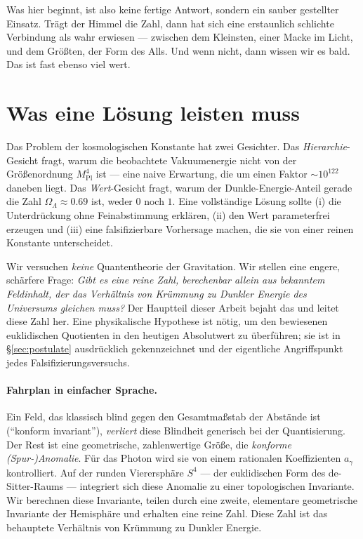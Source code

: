 \documentclass[11pt,a4paper]{article}
\theoremstyle{definition}
\theoremstyle{remark}
\newcommand{\ag}{a_\gamma}
\newcommand{\OL}{\Omega_\Lambda}
\newcommand{\Mpl}{M_{\mathrm{Pl}}}
\begin{document}
Was hier beginnt, ist also keine fertige Antwort, sondern ein sauber gestellter Einsatz. Trägt der
Himmel die Zahl, dann hat sich eine erstaunlich schlichte Verbindung als wahr erwiesen --- zwischen
dem Kleinsten, einer Macke im Licht, und dem Größten, der Form des Alls. Und wenn nicht, dann wissen
wir es bald. Das ist fast ebenso viel wert.


\tableofcontents

\section{Was eine Lösung leisten muss}\label{sec:problem}
Das Problem der kosmologischen Konstante hat zwei Gesichter. Das \emph{Hierarchie}-Gesicht fragt,
warum die beobachtete Vakuumenergie nicht von der Größenordnung $\Mpl^4$ ist --- eine naive
Erwartung, die um einen Faktor $\sim10^{122}$ daneben liegt. Das \emph{Wert}-Gesicht fragt, warum
der Dunkle-Energie-Anteil gerade die Zahl $\OL\approx0.69$ ist, weder $0$ noch $1$. Eine
vollständige Lösung sollte (i) die Unterdrückung ohne Feinabstimmung erklären, (ii) den Wert
parameterfrei erzeugen und (iii) eine falsifizierbare Vorhersage machen, die sie von einer reinen
Konstante unterscheidet.

Wir versuchen \emph{keine} Quantentheorie der Gravitation. Wir stellen eine engere, schärfere
Frage: \emph{Gibt es eine reine Zahl, berechenbar allein aus bekanntem Feldinhalt, der das
Verhältnis von Krümmung zu Dunkler Energie des Universums gleichen muss?} Der Hauptteil dieser
Arbeit bejaht das und leitet diese Zahl her. Eine physikalische Hypothese ist nötig, um den
bewiesenen euklidischen Quotienten in den heutigen Absolutwert zu überführen; sie ist in
\S\ref{sec:postulate} ausdrücklich gekennzeichnet und der eigentliche Angriffspunkt jedes
Falsifizierungsversuchs.

\paragraph{Fahrplan in einfacher Sprache.} Ein Feld, das klassisch blind gegen den Gesamtmaßstab
der Abstände ist (``konform invariant''), \emph{verliert} diese Blindheit generisch bei der
Quantisierung. Der Rest ist eine geometrische, zahlenwertige Größe, die \emph{konforme
(Spur-)Anomalie}. Für das Photon wird sie von einem rationalen Koeffizienten $\ag$ kontrolliert.
Auf der runden Vierersphäre $S^4$ --- der euklidischen Form des de-Sitter-Raums --- integriert
sich diese Anomalie zu einer topologischen Invariante. Wir berechnen diese Invariante, teilen
durch eine zweite, elementare geometrische Invariante der Hemisphäre und erhalten eine reine Zahl.
Diese Zahl ist das behauptete Verhältnis von Krümmung zu Dunkler Energie.
\end{document}

